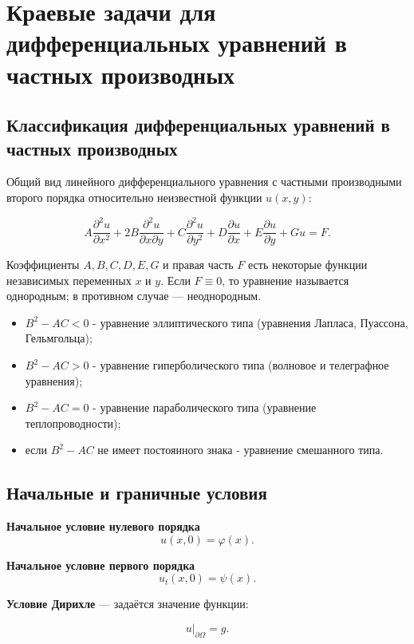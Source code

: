 \section{Краевые задачи для дифференциальных уравнений в частных производных}
\label{sec:boundary_value_problems_for_pdes}

\subsection{Классификация дифференциальных уравнений в частных производных}

Общий вид линейного дифференциального уравнения с частными производными второго порядка относительно неизвестной функции \( u(x, y) \):

$$A \frac{\partial^2 u}{\partial x^2} + 2B \frac{\partial^2 u}{\partial x \partial y} + C \frac{\partial^2 u}{\partial y^2} + D \frac{\partial u}{\partial x} + E \frac{\partial u}{\partial y} + Gu = F.$$

Коэффициенты \( A, B, C, D, E, G \) и правая часть \( F \) есть некоторые функции независимых переменных \( x \) и \( y \). Если \( F \equiv 0 \), то уравнение называется однородным; в противном случае — неоднородным.

\begin{itemize}
	\item $B^2 - AC < 0$ - уравнение эллиптического типа (уравнения Лапласа, Пуассона, Гельмгольца);
	\item $B^2 - AC > 0$ - уравнение гиперболического типа (волновое и телеграфное уравнения);
	\item $B^2 - AC = 0$ - уравнение параболического типа (уравнение теплопроводности);
	\item если $B^2 - AC$ не имеет постоянного знака - уравнение смешанного типа.
\end{itemize}

\subsection{Начальные и граничные условия}

\textbf{Начальное условие нулевого порядка}
$$u(x, 0) = \varphi(x).$$

\textbf{Начальное условие первого порядка}
$$u_t(x, 0) = \psi(x).$$

\dotfill

\textbf{Условие Дирихле} — задаётся значение функции:

$$u|_{\partial\Omega} = g.$$

